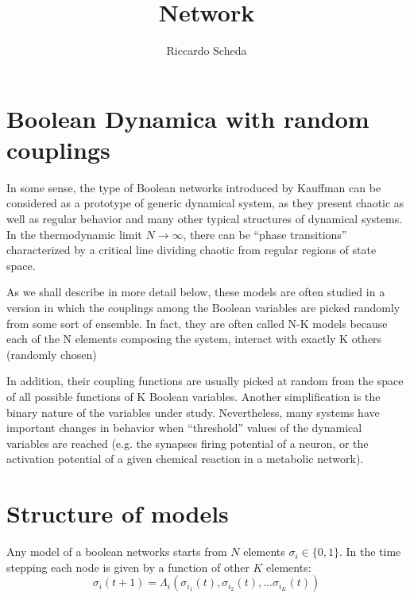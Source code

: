 \documentclass[11pt]{article}
\title{Network}
\author{Riccardo Scheda}
\begin{document}
\section{Boolean Dynamica with random couplings}

In some sense, the type of Boolean networks introduced by Kauffman can
be considered as a prototype of generic dynamical system, as they present
chaotic as well as regular behavior and many other typical structures of
dynamical systems. In the thermodynamic limit $N\to \infty$, there can be
“phase transitions” characterized by a critical line dividing chaotic from
regular regions of state space.


As we shall describe in more detail below, these models are often studied
in a version in which the couplings among the Boolean variables are picked
randomly from some sort of ensemble. In fact, they are often called N-K
models because each of the N elements composing the system, interact with
exactly K others (randomly chosen)

In addition, their coupling functions
are usually picked at random from the space of all possible functions of K
Boolean variables.
Another simplification is the binary nature of the variables under study.
Nevertheless, many systems have important changes in behavior when
“threshold” values of the dynamical variables are reached (e.g. the synapses
firing potential of a neuron, or the activation potential of a given chemical
reaction in a metabolic network).


\section{Structure of models}

Any model of a boolean networks starts from $N$ elements $\sigma_i \in \{0,1\}$. In the time stepping each node is given by a function of other $K$ elements:
\begin{equation}
\sigma_i(t+1) = \Lambda_i(\sigma_{i_1}(t),\sigma_{i_2}(t),...\sigma_{i_K}(t))
\label{eq:1}
\end{equation}
\end{document}
